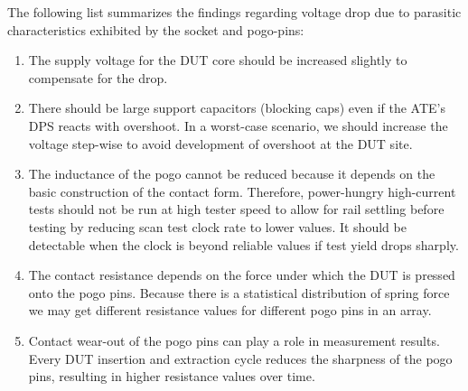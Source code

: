 The following list summarizes the findings regarding voltage drop
due to parasitic characteristics exhibited by the socket and pogo-pins:

\begin{enumerate}[topsep=8pt,itemsep=4pt,partopsep=4pt, parsep=4pt]

    \item
    The supply voltage for the \acs{DUT} core should be increased slightly to
    compensate for the drop.

    \item
    There should be large support capacitors (blocking caps) even if the
    \acs{ATE}'s \ac{DPS} reacts with overshoot.
    In a worst-case scenario, we should increase the voltage step-wise to avoid
    development of overshoot at the \ac{DUT} site.

    \item
    The inductance of the pogo cannot be reduced because it depends on the basic
    construction of the contact form.
    Therefore, power-hungry high-current tests should not be run at high
    tester speed to allow for rail settling before testing by reducing scan test
    clock rate to lower values.
    It should be detectable when the clock is beyond reliable values if
    test yield drops sharply.

    \item
    The contact resistance depends on the force under which
    the DUT is pressed onto the pogo pins. Because there is a statistical
    distribution of spring force we may get different resistance values for
    different pogo pins in an array.

    \item
    Contact wear-out of the pogo pins can play a role in measurement
    results. Every \ac{DUT} insertion and extraction cycle reduces the
    sharpness of the pogo pins, resulting in higher resistance values over time.

\end{enumerate}



